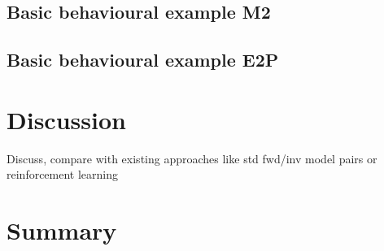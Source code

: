\documentclass[11pt]{llncs}
\begin{document}
\subsection{Basic behavioural example M2}
\label{sec:exprs_basic_ex_m2}
\subsection{Basic behavioural example E2P}
\label{sec:exprs_basic_ex_e2p}



\section{Discussion}
\label{sec:orga3d6260}

Discuss, compare with existing approaches like std fwd/inv model
  pairs or reinforcement learning

\section{Summary}
\label{sec:orgc71dbe7}



\printbibliography
\end{document}
